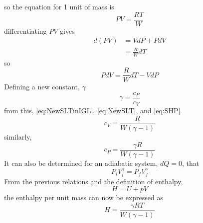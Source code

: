 so the equation for 1 unit of mass is
\begin{equation}\label{eq:IGL1}
PV=\frac{RT}{W}
\end{equation}
differentiating $PV$ gives
\begin{align}
d(PV)&=VdP+PdV\\
&=\frac{R}{W}dT
\end{align}
so
\begin{equation}\label{eq:NewSLTinIGL}
PdV=\frac{R}{W}dT-VdP
\end{equation}
Defining a new constant, $\gamma$
\begin{equation}\label{eq:Gamma}
\gamma=\frac{c_P}{c_V}
\end{equation}%
from this, \ref{eq:NewSLTinIGL}, \ref{eq:NewSLT}, and \ref{eq:SHP}
\begin{equation}\label{eq:GammaincV}
c_V=\frac{R}{W(\gamma-1)}
\end{equation}
similarly,
\begin{equation}\label{eq:GammaincP}
c_P=\frac{\gamma R}{W(\gamma-1)}
\end{equation}
It can also be determined for an adiabatic system, $dQ=0$, that
\begin{equation}\label{eq:adiabat}
P_iV_i^{\gamma}=P_fV_f^{\gamma}
\end{equation}
From the previous relations and the definition of enthalpy,
\begin{equation}\label{eq:Enthalpy}
H=U+pV
\end{equation}%
the enthalpy per unit mass can now be expressed as
\begin{equation}\label{eq:Enthalpypermass}
H=\frac{\gamma RT}{W(\gamma-1)}
\end{equation}
